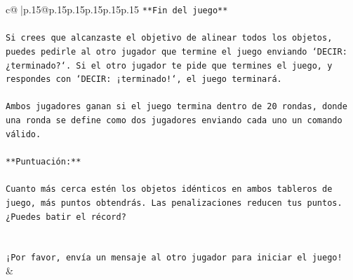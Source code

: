 \documentclass{article}
\begin{document}
{\begin{supertabular}{c@{$\;$}|p{.15\linewidth}@{}p{.15\linewidth}p{.15\linewidth}p{.15\linewidth}p{.15\linewidth}p{.15\linewidth}}
{{{\texttt{**Fin del juego**} \\
\\ 
\texttt{Si crees que alcanzaste el objetivo de alinear todos los objetos, puedes pedirle al otro jugador que termine el juego enviando `DECIR: ¿terminado?`. Si el otro jugador te pide que termines el juego, y respondes con `DECIR: ¡terminado!`, el juego terminará.} \\
\\ 
\texttt{Ambos jugadores ganan si el juego termina dentro de 20 rondas, donde una ronda se define como dos jugadores enviando cada uno un comando válido.} \\
\\ 
\texttt{**Puntuación:**} \\
\\ 
\texttt{Cuanto más cerca estén los objetos idénticos en ambos tableros de juego, más puntos obtendrás. Las penalizaciones reducen tus puntos. ¿Puedes batir el récord?} \\
\\ 
\\ 
\texttt{¡Por favor, envía un mensaje al otro jugador para iniciar el juego!} \\
            }
        }
    }
    & \\ \\


\end{supertabular}}
\end{document}
